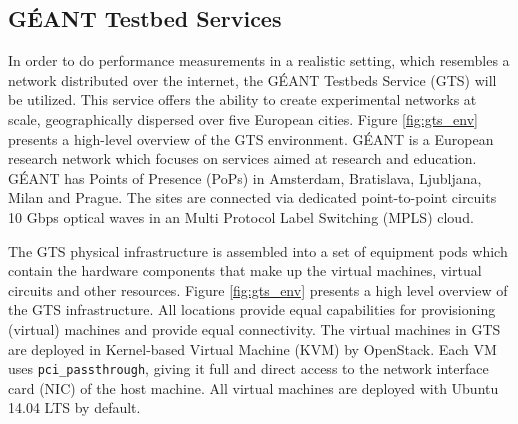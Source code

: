


\subsection{GÉANT Testbed Services} \label{gts_sec}
In order to do performance measurements in a realistic setting, which resembles a network distributed over the internet, the GÉANT Testbeds Service (GTS) will be utilized. This service offers the ability to create experimental networks at scale, geographically dispersed over five European cities. Figure \ref{fig:gts_env} presents a high-level overview of the GTS environment. GÉANT is a European research network which focuses on services aimed at research and education. GÉANT has Points of Presence (PoPs) in Amsterdam, Bratislava, Ljubljana, Milan and Prague. The sites are connected via dedicated point-to-point circuits 10 Gbps optical waves in an Multi Protocol Label Switching (MPLS) cloud.

The GTS physical infrastructure is assembled into a set of equipment pods which contain the hardware components that make up the virtual machines, virtual circuits and other resources. Figure \ref{fig:gts_env} presents a high level overview of the GTS infrastructure. All locations provide equal capabilities for provisioning (virtual) machines and provide equal connectivity. The virtual machines in GTS are deployed in Kernel-based Virtual Machine (KVM) by OpenStack. Each VM uses \texttt{pci\_passthrough}, giving it full and direct access to the network interface card (NIC) of the host machine. All virtual machines are deployed with Ubuntu 14.04 LTS by default.

